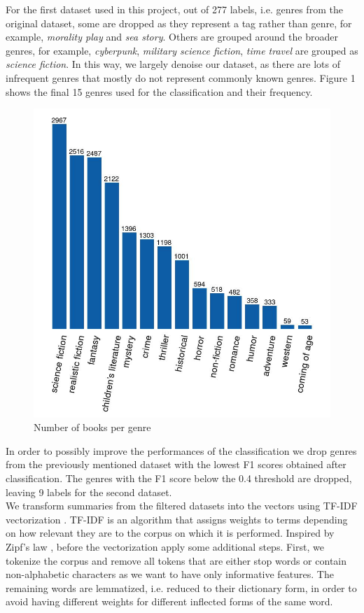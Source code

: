 \documentclass{article}
\begin{document}
For the first dataset used in this project, out of 277 labels, i.e. genres from the original dataset, some are dropped as they represent a tag rather than genre, for example, \textit{morality play} and \textit{sea story}. Others are grouped around the broader genres, for example, \textit{cyberpunk}, \textit{military science fiction}, \textit{time travel} are grouped as \textit{science fiction}. In this way, we largely denoise our dataset, as there are lots of infrequent genres that mostly do not represent commonly known genres. Figure 1 shows the final 15 genres used for the classification and their frequency. \\
\begin{figure}
\centering
\includegraphics[width=\linewidth]{../../gfx/genrecounts.jpg}
\caption{\small{Number of books per genre}}
\label{fig:figure1}
\end{figure} 
In order to possibly improve the performances of the classification we drop genres from the previously mentioned dataset with the lowest F1 scores obtained after classification. The genres with the F1 score below the 0.4 threshold are dropped, leaving 9 labels for the second dataset. \\
We transform summaries from the filtered datasets into the vectors using TF-IDF vectorization \cite{ramos2003using}. TF-IDF is an algorithm that assigns weights to terms depending on how relevant they are to the corpus on which it is performed. Inspired by Zipf's law \cite{newman2005power}, before the vectorization apply some additional steps. First, we tokenize the corpus and remove all tokens that are either stop words or contain non-alphabetic characters as we want to have only informative features. The remaining words are lemmatized, i.e. reduced to their dictionary form, in order to avoid having different weights for different inflected forms of the same word. \\
\end{document}
